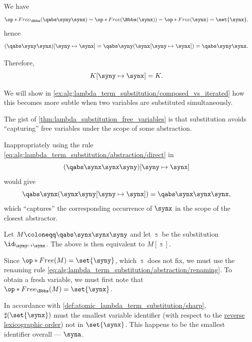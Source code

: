 \begin{example}
\begin{thmenum}
    We have
    \begin{equation*}
      \op*{Free}_\Bbbs(\qabs \syny \synx)
      =
      \op*{Free}(\Bbbs(\synx))
      =
      \op*{Free}(\synx)
      =
      \set{ \synx },
    \end{equation*}
    hence
    \begin{align*}
      (\qabs \syny \synx)[\syny \mapsto \synx]
      =
      \qabs \syny (\synx[\syny \mapsto \synx])
      =
      \qabs \syny \synx.
    \end{align*}

    Therefore,
    \begin{equation*}
      K[\syny \mapsto \synx] = K.
    \end{equation*}

    We will show in \cref{ex:alg:lambda_term_substitution/composed_vs_iterated} how this becomes more subtle when two variables are substituted simultaneously.

     The gist of \cref{thm:lambda_substitution_free_variables} is that substitution avoids \enquote{capturing} free variables under the scope of some abstraction.

    Inappropriately using the rule \eqref{eq:alg:lambda_term_substitution/abstraction/direct} in
    \begin{equation*}
      (\qabs \synx \synx \syny)[\syny \mapsto \synx]
    \end{equation*}
    would give
    \begin{equation*}
      \qabs \synx (\synx \syny[\syny \mapsto \synx]) = \qabs \synx \synx \synx,
    \end{equation*}
    which \enquote{captures} the corresponding occurrence of \( \synx \) in the scope of the closest abstractor.

    Let \( M \coloneqq \qabs \synx \synx \syny \) and let \( \Bbbs \) be the substitution \( \id_{\syny \mapsto \synx} \). The above is then equivalent to \( M[\Bbbs] \).

    Since \( \op*{Free}(M) = \set{ \syny } \), which \( \Bbbs \) does not fix, we must use the renaming rule \eqref{eq:alg:lambda_term_substitution/abstraction/renaming}. To obtain a fresh variable, we must first note that \( \op*{Free}_\Bbbs(M) = \set{ \synx } \).

    In accordance with \cref{def:atomic_lambda_term_substitution/sharp}, \( \sharp(\set{ \synx }) \) must the smallest variable identifier (with respect to the \hyperref[def:lexicographic_order]{reverse lexicographic order}) not in \( \set{ \synx } \). This happens to be the smallest identifier overall --- \( \syna \).


\end{thmenum}
\end{example}
